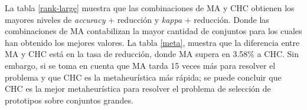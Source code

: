 La tabla \ref{rank-large} muestra que las combinaciones de MA y CHC obtienen los mayores niveles de \emph{accuracy} + reducción y \emph{kappa} + reducción. Donde las combinaciones de MA contabilizan la mayor cantidad de conjuntos para los cuales han obtenido los mejores valores. La tabla \ref{meta}, muestra que la diferencia entre MA y CHC está en la tasa de reducción, donde MA supera en 3.58\% a CHC. Sin embargo, si se toma en cuenta que MA tarda 15 veces más para resolver el problema y que CHC es la metaheurística más rápida; se puede concluir que CHC es la mejor metaheurística para resolver el problema de selección de prototipos sobre conjuntos grandes.

